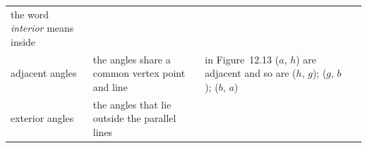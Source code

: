 \begin{center}
\begin{xtabular*}{\mytablewidth}[t]{|p{3cm}|p{3cm}|p{3cm}|p{20\mystarwidth}|}
        the word \textsl{interior} means inside%
     \tabularnewline{}
        adjacent angles &
        the angles share a common vertex point and line &
        in Figure~12.13 ($a$, \begin{math}h\end{math}) are adjacent and so are (\begin{math}h\end{math}, \begin{math}g\end{math}); (\begin{math}g\end{math}, \begin{math}b\end{math}); (\begin{math}b\end{math}, \begin{math}a\end{math}) &
     \tabularnewline{}
        exterior angles &
        the angles that lie outside the parallel lines &

\end{xtabular*}
\end{center}
